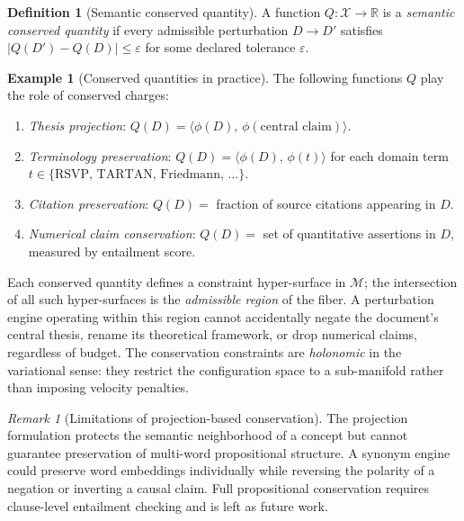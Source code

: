 \documentclass[12pt, a4paper]{article}
\theoremstyle{plain}
\theoremstyle{definition}
\newtheorem{definition}[theorem]{Definition}
\newtheorem{example}[theorem]{Example}
\theoremstyle{remark}
\newtheorem{remark}[theorem]{Remark}
\newcommand{\calX}{\mathcal{X}}
\newcommand{\calM}{\mathcal{M}}
\newcommand{\bR}{\mathbb{R}}
\newcommand{\ve}{\varepsilon}
\newcommand{\inner}[2]{\langle #1,\, #2 \rangle}
\begin{document}
\begin{definition}[Semantic conserved quantity]
\label{def:noether}
A function $Q : \calX \to \bR$ is a \emph{semantic conserved quantity} if
every admissible perturbation $D \to D'$ satisfies $|Q(D') - Q(D)| \le \ve$
for some declared tolerance $\ve$.
\end{definition}

\begin{example}[Conserved quantities in practice]
The following functions $Q$ play the role of conserved charges:
\begin{enumerate}[label=(\roman*)]
  \item \emph{Thesis projection}: $Q(D) = \inner{\phi(D)}{\phi(\text{central claim})}$.
  \item \emph{Terminology preservation}: $Q(D) = \inner{\phi(D)}{\phi(t)}$ for
        each domain term $t \in \{\text{RSVP, TARTAN, Friedmann, \ldots}\}$.
  \item \emph{Citation preservation}: $Q(D) = $ fraction of source citations
        appearing in $D$.
  \item \emph{Numerical claim conservation}: $Q(D) = $ set of quantitative
        assertions in $D$, measured by entailment score.
\end{enumerate}
\end{example}

Each conserved quantity defines a constraint hyper-surface in $\calM$; the
intersection of all such hyper-surfaces is the \emph{admissible region} of the
fiber.  A perturbation engine operating within this region cannot accidentally
negate the document's central thesis, rename its theoretical framework, or
drop numerical claims, regardless of budget.  The conservation constraints are
\emph{holonomic} in the variational sense: they restrict the configuration space
to a sub-manifold rather than imposing velocity penalties.

\begin{remark}[Limitations of projection-based conservation]
The projection formulation protects the semantic neighborhood of a concept but
cannot guarantee preservation of multi-word propositional structure.  A synonym
engine could preserve word embeddings individually while reversing the polarity
of a negation or inverting a causal claim.  Full propositional conservation
requires clause-level entailment checking and is left as future work.
\end{remark}


\end{document}
